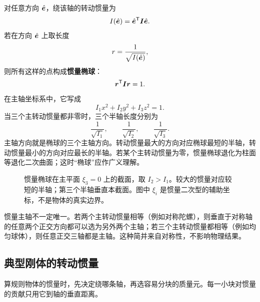 对任意方向 \(\hat{\boldsymbol{e}}\)，绕该轴的转动惯量为
\begin{equation}
I(\hat{\boldsymbol{e}})=\hat{\boldsymbol{e}}^{\mathsf T}\boldsymbol{I}\hat{\boldsymbol{e}}.
\label{eq:inertia-direction}
\end{equation}
若在方向 \(\hat{\boldsymbol{e}}\) 上取长度
\[
r=\frac{1}{\sqrt{I(\hat{\boldsymbol{e}})}},
\]
则所有这样的点构成\textbf{惯量椭球}：
\begin{equation}
\boldsymbol{r}^{\mathsf T}\boldsymbol{I}\boldsymbol{r}=1.
\label{eq:inertia-ellipsoid}
\end{equation}
在主轴坐标系中，它写成
\begin{equation}
I_1x^2+I_2y^2+I_3z^2=1.
\label{eq:inertia-ellipsoid-principal}
\end{equation}
当三个主转动惯量都非零时，三个半轴长度分别为
\[
\frac{1}{\sqrt{I_1}},\qquad
\frac{1}{\sqrt{I_2}},\qquad
\frac{1}{\sqrt{I_3}}.
\]
主轴方向就是椭球的三个主轴方向。转动惯量最大的方向对应椭球最短的半轴，转动惯量最小的方向对应最长的半轴。若某个主转动惯量为零，惯量椭球退化为柱面等退化二次曲面；这时“椭球”应作广义理解。

\begin{figure}[htbp]
\centering
{}
\caption{惯量椭球在主平面 $\xi_3=0$ 上的截面，取 $I_2>I_1$。较大的惯量对应较短的半轴；第三个半轴垂直本截面。图中 $\xi_i$ 是惯量二次型的辅助坐标，不是物体的真实边界。}
\label{fig:inertia-ellipsoid}
\end{figure}

\begin{remark}
惯量主轴不一定唯一。若两个主转动惯量相等（例如对称陀螺），则垂直于对称轴的任意两个正交方向都可以选为另外两个主轴；若三个主转动惯量都相等（例如均匀球体），则任意正交三轴都是主轴。这种简并来自对称性，不影响物理结果。
\end{remark}

\subsection{典型刚体的转动惯量}

算规则物体的惯量时，先决定绕哪条轴，再选容易分块的质量元。每一小块对惯量的贡献只用它到轴的垂直距离。

